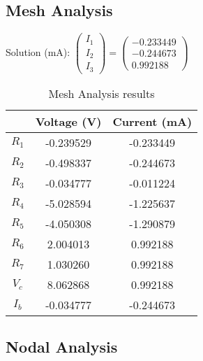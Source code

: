 

 \subsection{Mesh Analysis}

Solution (mA):
$ \left(\begin{array}{c} I_1 \\ I_2 \\ I_3  \end{array}\right) = \left(\begin{array}{c} -0.233449 \\ -0.244673 \\ 0.992188 \end{array}\right) $
 \begin{table}[H]
 \footnotesize
 \centering
 \caption{Mesh Analysis results}
 \label{tab:tables}
 \begin{center}
 \begin{tabular}{ccc} 
 & Voltage (V) & Current (mA) \\ 
 \hline 


 \hline 
 $R_1$ & -0.239529 & -0.233449 \\ 
 \hline 
 $R_2$ & -0.498337 & -0.244673 \\ 
 \hline 
 $R_3$ & -0.034777 & -0.011224 \\ 
 \hline 
 $R_4$ & -5.028594 & -1.225637 \\ 
 \hline 
 $R_5$ & -4.050308 & -1.290879 \\ 
 \hline 
 $R_6$ & 2.004013 & 0.992188 \\ 
 \hline 
 $R_7$ & 1.030260 & 0.992188 \\ 
 \hline 
 $V_c$ & 8.062868 & 0.992188 \\ 
 \hline 
 $I_b$ & -0.034777 & -0.244673 \\ 
 \hline 
 \end{tabular} 
 \end{center} 
 \end{table}

 \subsection{Nodal Analysis}

